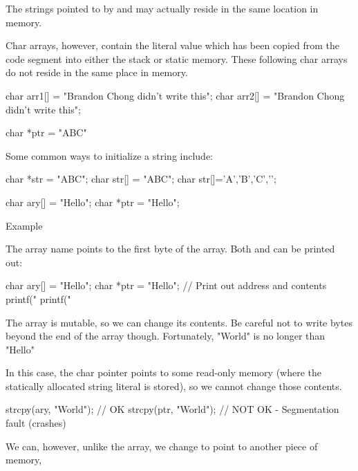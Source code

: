 The strings pointed to by  and  may actually reside in the same location in memory.

Char arrays, however, contain the literal value which has been copied from the code segment into either the stack or static memory. These following char arrays do not reside in the same place in memory.

\begin{code}[language=C]
char arr1[] = "Brandon Chong didn't write this";
char arr2[] = "Brandon Chong didn't write this";
\end{code}

\begin{code}[language=C]
char *ptr = "ABC"
\end{code}

Some common ways to initialize a string include:

\begin{code}[language=C]
char *str = "ABC";
char str[] = "ABC";
char str[]={'A','B','C','\0'};
\end{code}

\begin{code}[language=C]
char ary[] = "Hello";
char *ptr = "Hello";
\end{code}

Example

The array name points to the first byte of the array. Both 
and  can be printed out:

\begin{code}[language=C]
char ary[] = "Hello";
char *ptr = "Hello";
// Print out address and contents
printf("%
printf("%
\end{code}

The array is mutable, so we can change its contents. Be careful not to write bytes beyond the end of the array though. Fortunately, "World" is no longer than "Hello"

In this case, the char pointer  points to some read-only memory (where the statically allocated string literal is stored), so we cannot change those contents.

\begin{code}[language=C]
strcpy(ary, "World"); // OK
strcpy(ptr, "World"); // NOT OK - Segmentation fault (crashes)
\end{code}

We can, however, unlike the array, we change  to point to
another piece of memory,

